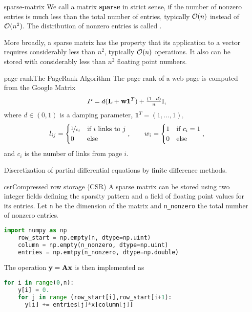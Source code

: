 \begin{Definition}{sparse-matrix}
  We call a matrix \textbf{sparse} in strict
  sense, if the number of nonzero entries is much less than the total
  number of entries, typically $\mathcal O(n)$ instead of $\mathcal O(n^2)$. The
  distribution of nonzero entries is called .

  More broadly, a sparse matrix has the property that its application
  to a vector requires considerably less than $n^2$, typically
  $\mathcal O(n)$ operations. It also can be stored with considerably less
  than $n^2$ floating point numbers.
\end{Definition}

\begin{Example*}{page-rank}{The PageRank Algorithm}
  The page rank of a web page is computed from the Google Matrix
  \begin{gather}
    P = d (\mathbf L+\mathbf w \mathbf 1^T) + \tfrac{(1-d)}{n} \mathbb I,
  \end{gather}
  where $d \in (0,1)$ is a damping parameter, $\mathbf 1^T = (1,\dots,1)$,
  \begin{gather}
    l_{ij} =
    \begin{cases}
      \nicefrac1{c_i} & \text{if $i$ links to $j$}\\0&\text{else} 
    \end{cases},
    \qquad
    w_i =
    \begin{cases}
      1 &\text{if } c_i=1\\
      0&\text{else}
    \end{cases},
  \end{gather}
  and $c_i$ is the number of links from page $i$.
\end{Example*}

\begin{example}
  Discretization of partial differential equations by finite
  difference methods.
\end{example}

\begin{Example*}{csr}{Compressed row storage (CSR)}
  A sparse matrix can be stored using two integer fields defining the
  sparsity pattern and a field of floating point values for its
  entries. Let \lstinline!n! be the dimension of the matrix and
  \lstinline!n_nonzero! the total number of nonzero entries.
  \begin{lstlisting}[language=Python]
    import numpy as np
    row_start = np.empty(n, dtype=np.uint)
    column = np.empty(n_nonzero, dtype=np.uint)
    entries = np.emtpy(n_nonzero, dtype=np.double)
  \end{lstlisting}

  The operation $\mathbf y=\mathbf A\mathbf x$ is then implemented as
  \begin{lstlisting}[language=Python]
    for i in range(0,n):
    y[i] = 0.
    for j in range (row_start[i],row_start[i+1):
      y[i] += entries[j]*x[column[j]]
  \end{lstlisting}  
\end{Example*}

